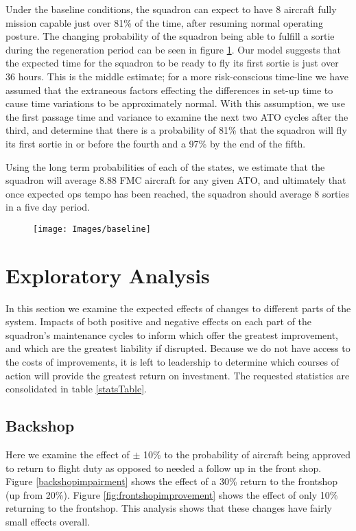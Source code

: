 \documentclass[12pt]{amsart}
\begin{document}
Under the baseline conditions, the squadron can expect to have 8 aircraft fully mission capable
just over 81\% of the time, after resuming normal operating posture.
The changing probability of the squadron being able to fulfill a sortie during the regeneration 
period can be seen in figure \ref{fig:baseline}.
Our model suggests that the expected time for the squadron to be ready to fly its first sortie
is just over 36 hours. This is the middle estimate; for a more risk-conscious time-line
we have assumed that the extraneous factors effecting the differences in set-up time to 
cause time variations to be approximately normal.
With this assumption, we use the first passage time and variance to examine the next two 
ATO cycles after the third, and determine that there is a probability of
81\% that the squadron will fly its first sortie in or before the fourth
and a 97\% by the end of the fifth.

Using the long term probabilities of each of the states, we estimate that the 
squadron will average 8.88 FMC aircraft for any given ATO, and ultimately
that once expected ops tempo has been reached, the squadron should average
8 sorties in a five day period.

\begin{figure}
	\centering
	\texttt{[image: Images/baseline]}
	\caption{}
	\label{fig:baseline}
\end{figure}


\section{Exploratory Analysis}


In this section we examine the expected effects of changes to different
parts of the system.
Impacts of both positive and negative effects on each part of the squadron's 
maintenance cycles to inform which offer the greatest improvement, 
and which are the greatest liability if disrupted.
Because we do not have access to the costs of improvements, 
it is left to leadership to determine which courses of action will provide
the greatest return on investment.
The requested statistics are consolidated in table \ref{statsTable}.

\subsection{Backshop}
Here we examine the effect of \(\pm\) 10\% to the probability of aircraft 
being approved to return to flight duty as opposed to needed a follow up in the
front shop. Figure \ref{backshopimpairment} shows the effect of a 30\% return 
to the frontshop (up from 20\%). Figure \ref{fig:frontshopimprovement} shows the
effect of only 10\% returning to the frontshop.
This analysis shows that these changes have fairly small effects overall.
\end{document}
